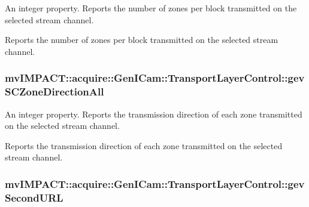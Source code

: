 An integer property. Reports the number of zones per block transmitted on the selected stream channel. 

Reports the number of zones per block transmitted on the selected stream channel. \hypertarget{classmv_i_m_p_a_c_t_1_1acquire_1_1_gen_i_cam_1_1_transport_layer_control_ac73ebd07e6fa8eba10423619dcb729ed}{
\subsubsection[{gev\+S\+C\+Zone\+Direction\+All}]{ mv\+I\+M\+P\+A\+C\+T\+::acquire\+::\+Gen\+I\+Cam\+::\+Transport\+Layer\+Control\+::gev\+S\+C\+Zone\+Direction\+All}}\label{classmv_i_m_p_a_c_t_1_1acquire_1_1_gen_i_cam_1_1_transport_layer_control_ac73ebd07e6fa8eba10423619dcb729ed}


An integer property. Reports the transmission direction of each zone transmitted on the selected stream channel. 

Reports the transmission direction of each zone transmitted on the selected stream channel. \hypertarget{classmv_i_m_p_a_c_t_1_1acquire_1_1_gen_i_cam_1_1_transport_layer_control_aed5fe31d65a43e3f9e314e28f3c126db}{
\subsubsection[{gev\+Second\+U\+R\+L}]{ mv\+I\+M\+P\+A\+C\+T\+::acquire\+::\+Gen\+I\+Cam\+::\+Transport\+Layer\+Control\+::gev\+Second\+U\+R\+L}}\label{classmv_i_m_p_a_c_t_1_1acquire_1_1_gen_i_cam_1_1_transport_layer_control_aed5fe31d65a43e3f9e314e28f3c126db}


